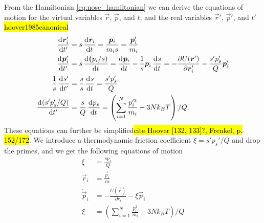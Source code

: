 From the Hamiltonian \cref{eq:nose_hamiltonian} we can derive the equations of motion for the virtual variables $\vec r$, $\vec p$, and $t$, and the real variables $\vec r'$, $\vec p'$, and $t'$ \hl{hoover1985canonical}
\begin{align*}
    \dod{\vec r_i'}{t'}     &= s\dod{\vec r_i}{t} = \frac{\vec p_i}{m_is} = \frac{\vec p_i'}{m_i} \\
    \dod{\vec p_i'}{t'}     &= s\dod{\vec (p_i/s)}{t} = \dod{\vec p_i}{t} - \frac{1}{s}\vec p_i\dod{s}{t} = -\frac{\partial U(\vec r')}{\partial \vec r_i'} - \frac{s'p_s'}{Q}\vec p_i' \\
    \frac{1}{s}\dod{s'}{t'} &= \frac{s}{s}\dod{s}{t} = \frac{s'p_s'}{Q} \\
    \dod{(s'p_s'/Q)}{t'}    &= \frac{s}{Q}\dod{p_s}{t} = \left( \sum_{i=1}^N \frac{p_i'^2}{m_i} - 3Nk_BT\right) / Q.
\end{align*}
These equations can further be simplified\hl{cite Hoover [132, 133]?, Frenkel, p. 152/172}. We introduce a thermodynamic friction coefficient $\xi = s'p_s'/Q$ and drop the primes, and we get the following equations of motion
\begin{align}
    \xi             &= \frac{sp_s}{Q} \label{eq:nose_xi}\\
    \dot{\vec r}_i  &= \frac{\vec p_i}{m} \label{eq:nose_position}\\
    \dot{\vec p}_i  &= -\frac{U(\vec r)}{\partial r_i} - \xi \vec p_i \label{eq:nose_momentum}\\
    \dot\xi         &= \left( \sum_{i=1}^N \frac{p_i^2}{m_i} - 3Nk_BT \right) / Q \label{eq:nose_dotxi}%
\end{align}

